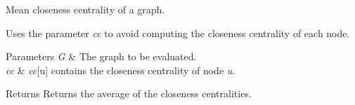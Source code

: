 Mean closeness centrality of a graph. 

Uses the parameter {\itshape cc} to avoid computing the closeness centrality of each node.


\begin{DoxyParams}{Parameters}
{\em G} & The graph to be evaluated. \\
\hline
{\em cc} & {\itshape cc}\mbox{[}u\mbox{]} contains the closeness centrality of node {\itshape u}. \\
\hline
\end{DoxyParams}
\begin{DoxyReturn}{Returns}
Returns the average of the closeness centralities. 
\end{DoxyReturn}
